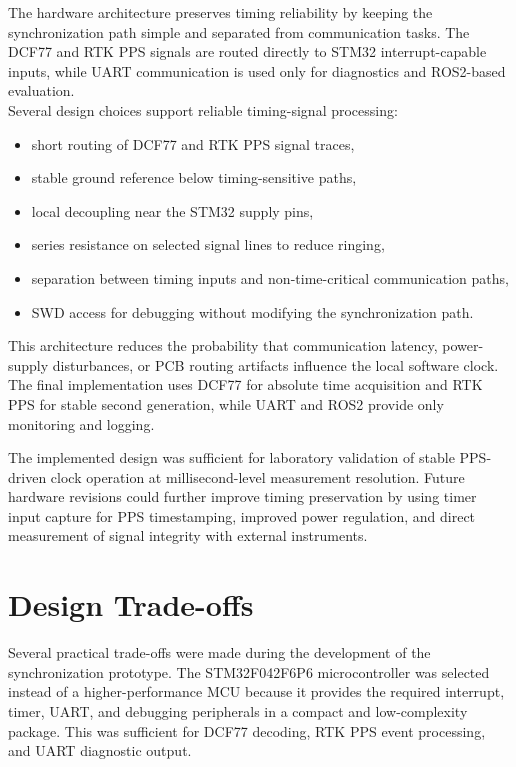 The hardware architecture preserves timing reliability by keeping the synchronization path simple and separated from communication tasks. The DCF77 and RTK PPS signals are routed directly to STM32 interrupt-capable inputs, while UART communication is used only for diagnostics and ROS2-based evaluation.
\\
Several design choices support reliable timing-signal processing:
\begin{itemize}
    \item short routing of DCF77 and RTK PPS signal traces,
    \item stable ground reference below timing-sensitive paths,
    \item local decoupling near the STM32 supply pins,
    \item series resistance on selected signal lines to reduce ringing,
    \item separation between timing inputs and non-time-critical communication paths,
    \item SWD access for debugging without modifying the synchronization path.
\end{itemize}

This architecture reduces the probability that communication latency, power-supply disturbances, or PCB routing artifacts influence the local software clock. The final implementation uses DCF77 for absolute time acquisition and RTK PPS for stable second generation, while UART and ROS2 provide only monitoring and logging.

The implemented design was sufficient for laboratory validation of stable PPS-driven clock operation at millisecond-level measurement resolution. Future hardware revisions could further improve timing preservation by using timer input capture for PPS timestamping, improved power regulation, and direct measurement of signal integrity with external instruments.

\section{Design Trade-offs}

Several practical trade-offs were made during the development of the synchronization prototype. The STM32F042F6P6 microcontroller was selected instead of a higher-performance MCU because it provides the required interrupt, timer, UART, and debugging peripherals in a compact and low-complexity package. This was sufficient for DCF77 decoding, RTK PPS event processing, and UART diagnostic output.

